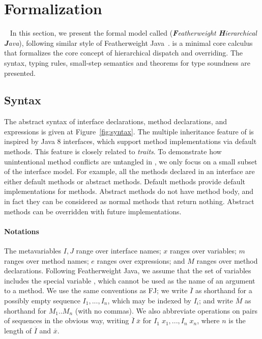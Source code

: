 \section{Formalization}~\label{sec:formalization}
In this section, we present the formal model called \MIM{} (\emph{\textbf{F}eatherweight \textbf{H}ierarchical \textbf{J}ava}), following similar style of 
Featherweight Java~\cite{Igarashi01FJ}. \MIM{} is a minimal core calculus that formalizes the core concept of hierarchical dispatch and overriding. The syntax, typing rules,
small-step semantics and theorems for type soundness are presented.

\subsection{Syntax}
The abstract syntax of \MIM{} interface declarations, method declarations, and expressions is given at Figure~\ref{fig:syntax}. The multiple
inheritance feature of \MIM{} is inspired by Java 8 interfaces, which support
method implementations via default methods. This feature is 
closely related to \emph{traits}. To demonstrate how
unintentional method conflicts are untangled in \MIM{}, we only focus on a small subset of the interface model. For example, all the methods declared
in an interface are either default methods or abstract methods. Default methods provide default implementations for methods. Abstract methods do not
have method body, and in fact they can be considered as normal methods that return nothing. Abstract methods can be overridden with future implementations.

\paragraph{Notations}
The metavariables $I, J$ range over interface names; $x$ ranges over variables; $m$ ranges over method names; $e$ ranges over expressions; and $M$ ranges over method declarations. Following Featherweight Java, we assume that the set of variables includes the special variable \kwthis, which cannot be used as the name of an argument to a method. We use the same
conventions as FJ; we write $\overline{I}$ as shorthand for a possibly empty sequence $I_1, ..., I_n$, which may be indexed by $I_i$; and write $\overline{M}$ as shorthand for $M_1 .. M_n$ (with no commas). We also abbreviate operations on pairs of sequences in the obvious way, writing $\overline{I} \; \overline{x}$ for $I_1 \; x_1, ..., I_n \; x_n$, where $n$ is the length of $\overline{I}$ and $\overline{x}$.

